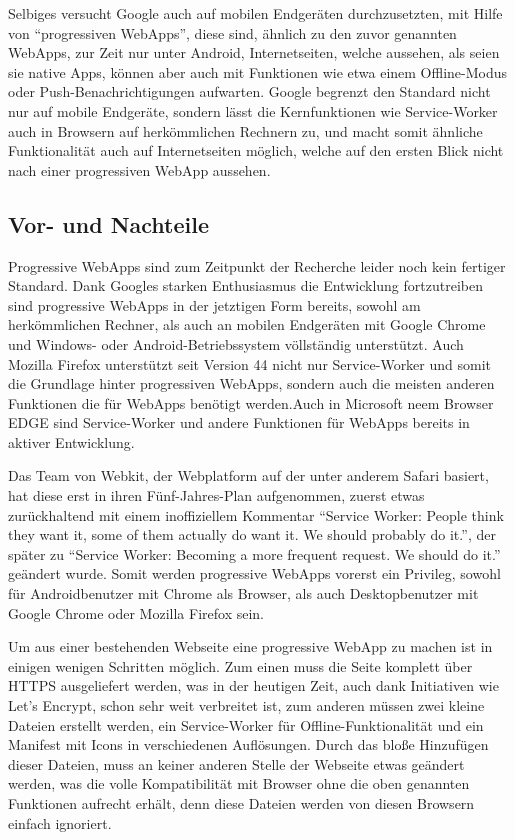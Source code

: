 \documentclass[a4paper,12pt,ngerman,listof=numbered]{scrartcl}      %
\let\oldcite\cite
\renewcommand{\cite}[1]{\textsuperscript{\oldcite{#1}}}
\begin{document}
	Selbiges versucht Google auch auf mobilen Endgeräten durchzusetzten, mit Hilfe von ``progressiven WebApps'', diese sind, ähnlich zu den zuvor genannten WebApps, zur Zeit nur unter Android, Internetseiten, welche aussehen, als seien sie native Apps, können aber auch mit Funktionen wie etwa einem Offline-Modus oder Push-Be\-nach\-rich\-ti\-gungen aufwarten. Google begrenzt den Standard nicht nur auf mobile Endgeräte, sondern lässt die Kernfunktionen wie Service-Worker auch in Browsern auf herkömmlichen Rechnern zu, und macht somit ähnliche Funktionalität auch auf Internetseiten möglich, welche auf den ersten Blick nicht nach einer progressiven WebApp aussehen.\cite{prwebappWiki}\par
	
	\subsection{Vor- und Nachteile}
	Progressive WebApps sind zum Zeitpunkt der Recherche leider noch kein fertiger Standard. Dank Googles starken Enthusiasmus die Entwicklung fortzutreiben sind progressive WebApps in der jetztigen Form bereits, sowohl am herkömmlichen Rechner, als auch an mobilen Endgeräten mit Google Chrome und Windows- oder Android-Betriebssystem völlständig unterstützt. Auch Mozilla Firefox unterstützt seit Version 44 nicht nur Service-Worker und somit die Grundlage hinter progressiven WebApps, sondern auch die meisten anderen Funktionen die für WebApps benötigt werden.Auch in Microsoft neem Browser EDGE sind Service-Worker und andere Funktionen für WebApps bereits in aktiver Entwicklung.\cite{swReady}\par
	Das Team von Webkit, der Webplatform auf der unter anderem Safari basiert, hat diese erst in ihren Fünf-Jahres-Plan aufgenommen, zuerst etwas zurückhaltend mit einem inoffiziellem Kommentar ``Service Worker: People think they want it, some of them actually do want it. We should probably do it.''\cite{webkitServiceWorkerTwitter}, der später zu ``Service Worker: Becoming a more frequent request. We should do it.''\cite{webkitServiceWorker5yPlan} geändert wurde. Somit werden progressive WebApps vorerst ein Privileg, sowohl für Androidbenutzer mit Chrome als Browser, als auch Desktopbenutzer mit Google Chrome oder Mozilla Firefox sein. \cite{telerikWebApp}\par
	Um aus einer bestehenden Webseite eine progressive WebApp zu machen ist in einigen wenigen Schritten möglich. Zum einen muss die Seite komplett über HTTPS ausgeliefert werden, was in der heutigen Zeit, auch dank Initiativen wie Let's Encrypt, schon sehr weit verbreitet ist, zum anderen müssen zwei kleine Dateien erstellt werden, ein Service-Worker für Offline-Funktionalität und ein Manifest mit Icons in verschiedenen Auflösungen. Durch das bloße Hinzufügen dieser Dateien, muss an keiner anderen Stelle der Webseite etwas geändert werden, was die volle Kompatibilität mit Browser ohne die oben genannten Funktionen aufrecht erhält, denn diese Dateien werden von diesen Browsern einfach ignoriert.\par
\end{document}

